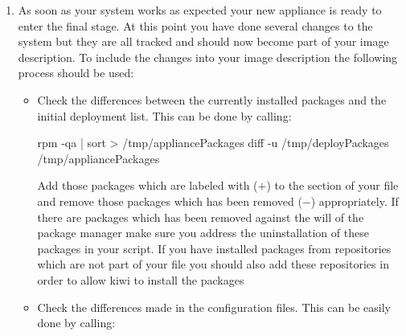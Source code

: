 \begin{enumerate}
\begin{itemize}
\begin{Command}{10cm}
rpm -qa | sort > /tmp/deployPackages
\end{Command}

      \item Check the output of the command  and
            include everything which is unknown to git and surely
            will not be changed by you and will not become part of the
            image description overlay files to the 
            files
      \end{itemize}

      After the initial package list exists and the git repository is
      clean you can start to configure the system. You never should
      install additional software just by installing an unmanaged archive
      or build and install from source. It's very hard to find out
      what binary files had been installed and it's also not architecture
      safe. If there is really no other way for the software to become
      part of the image you should address this issue directly in your
      image description and the  script but not after the initial
      deployment has happened.
\item As soon as your system works as expected your new appliance is
      ready to enter the final stage. At this point you have done several
      changes to the system but they are all tracked and should now become
      part of your image description. To include the changes into your
      image description the following process should be used:
      \begin{itemize}
      \item Check the differences between the currently installed packages
            and the initial deployment list. This can be done by calling:

\begin{Command}{12cm}
rpm -qa | sort > /tmp/appliancePackages
diff -u /tmp/deployPackages /tmp/appliancePackages
\end{Command}

            Add those packages which are labeled with ($+$) to the
             section of your 
            file and remove those packages which has been removed ($-$)
            appropriately. If there are packages which has been removed
            against the will of the package manager make sure you address
            the uninstallation of these packages in your 
            script. If you have installed packages from repositories which
            are not part of your  file you should also add these
            repositories in order to allow kiwi to install the packages
      \item Check the differences made in the configuration files. This
            can be easily done by calling:


\end{itemize}
\end{enumerate}
